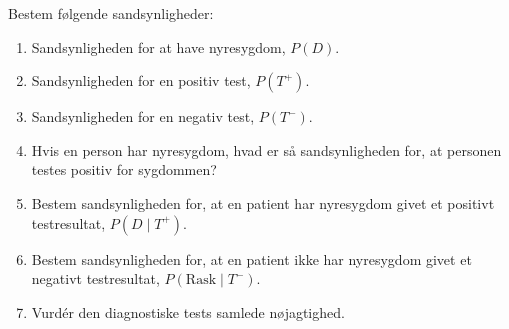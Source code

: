 \begin{example}
        Bestem følgende sandsynligheder:
        \begin{enumerate}[label=(\alph*)]
            \item Sandsynligheden for at have nyresygdom, $P(D)$.
            \item Sandsynligheden for en positiv test,  \( P(T^+) \).
            \item Sandsynligheden for en negativ test,  \( P(T^-) \).
            \item Hvis en person har nyresygdom, hvad er så sandsynligheden for, at personen testes positiv for sygdommen?
            \item Bestem sandsynligheden for, at en patient har nyresygdom givet et positivt testresultat, \( P(D \mid T^+) \).
            \item Bestem sandsynligheden for, at en patient ikke har nyresygdom givet et negativt testresultat, \( P(\text{Rask} \mid T^-) \).
            \item Vurdér den diagnostiske tests samlede nøjagtighed.
        \end{enumerate}
        \label{ex:renal-disease}
\end{example}

